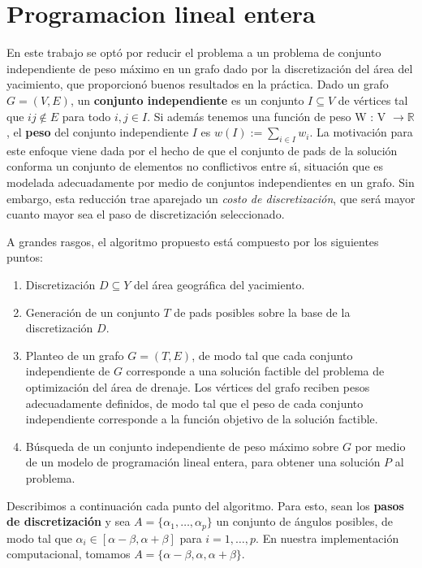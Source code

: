 \newpage
\section{Programacion lineal entera}

En este trabajo se opt\'o por reducir el problema a un problema de conjunto independiente de peso m\'aximo en un grafo dado por la discretizaci\'on del \'area del yacimiento, que proporcion\'o buenos resultados en la pr\'actica. Dado un grafo $G=(V,E)$, un \textbf{conjunto independiente} es un conjunto $I\subseteq V$ de v\'ertices tal que $ij\not\in E$ para todo $i,j\in I$. Si adem\'as tenemos una funci\'on de peso W : V $\rightarrow \mathbb{R}$, el \textbf{peso} del conjunto independiente $I$ es $w(I) := \sum_{i\in I} w_i$. La motivaci\'on para este enfoque viene dada por el hecho de que el conjunto de pads de la soluci\'on conforma un conjunto de elementos no conflictivos entre s\'\i, situaci\'on que es modelada adecuadamente por medio de conjuntos independientes en un grafo. Sin embargo, esta reducci\'on trae aparejado un \emph{costo de discretizaci\'on}, que ser\'a mayor cuanto mayor sea el paso de discretizaci\'on seleccionado.

A grandes rasgos, el algoritmo propuesto est\'a compuesto por los siguientes puntos:
\begin{enumerate}
\item Discretizaci\'on $D\subseteq Y$ del \'area geogr\'afica del yacimiento.
\item Generaci\'on de un conjunto $T$ de pads posibles sobre la base de la discretizaci\'on $D$.
\item Planteo de un grafo $G=(T,E)$, de modo tal que cada conjunto independiente de $G$ corresponde a una soluci\'on factible del problema de optimizaci\'on del \'area de drenaje. Los v\'ertices del grafo reciben pesos adecuadamente definidos, de modo tal que el peso de cada conjunto independiente corresponde a la funci\'on objetivo de la soluci\'on factible.
\item B\'usqueda de un conjunto independiente de peso m\'aximo sobre $G$ por medio de un modelo de programaci\'on lineal entera, para obtener una soluci\'on $P$ al problema.
\end{enumerate}
Describimos a continuaci\'on cada punto del algoritmo. Para esto, sean  los \textbf{pasos de discretizaci\'on} y sea $A=\{\alpha_1,\dots,\alpha_p\}$ un conjunto de \'angulos posibles, de modo tal que $\alpha_i\in[\alpha-\beta,\alpha+\beta]$ para $i=1,\dots,p$. En nuestra implementaci\'on computacional, tomamos $A=\{\alpha-\beta,\alpha,\alpha+\beta\}$.

